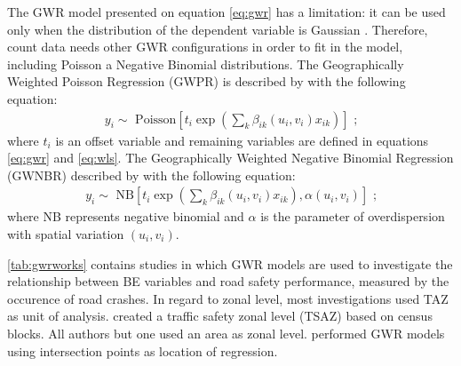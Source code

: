 The GWR model presented on equation \ref{eq:gwr} has a limitation: it can be used only when the distribution of the dependent variable is Gaussian \cite{DaSilva2013a}. Therefore, count data needs other GWR configurations in order to fit in the model, including Poisson a Negative Binomial distributions. The Geographically Weighted Poisson Regression (GWPR) is described by \textcite{Obelheiro2020,Nakaya2005a} with the following equation: \begin{align}
    y_i \sim \mbox{ Poisson} \left[t_i \exp \left(\sum_k \beta_{ik} \left( u_{i}, v_{i} \right) x_{ik} \right) \right] \mbox{ ;}
\end{align} where $t_i$ is an offset variable and remaining variables are defined in equations \ref{eq:gwr} and \ref{eq:wls}. The Geographically Weighted Negative Binomial Regression (GWNBR) described by \textcite{DaSilva2013a} with the following equation: \begin{align}
    y_i \sim \mbox{ NB} \left[t_i \exp \left( \sum_k \beta_{ik} \left( u_{i}, v_{i} \right) x_{ik} \right), \alpha \left( u_{i}, v_{i}\right) \right] \mbox{ ;}
\end{align} where NB represents negative binomial and $\alpha$ is the parameter of overdispersion with spatial variation $\left(u_i, v_i\right)$. 

\autoref{tab:gwrworks} contains studies in which GWR models are used to investigate the relationship between BE variables and road safety performance, measured by the occurence of road crashes. In regard to zonal level, most investigations used TAZ as unit of analysis. \textcite{Obelheiro2020} created a traffic safety zonal level (TSAZ) based on census blocks. All authors but one used an area as zonal level. \textcite{Arvin2019} performed GWR models using intersection points as location of regression. 

